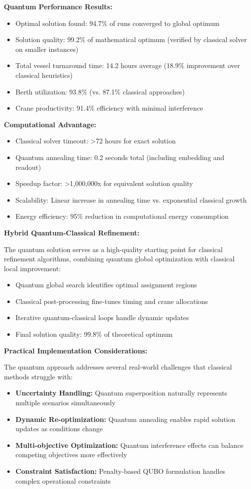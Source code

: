 \documentclass{article}
\begin{document}
\textbf{Quantum Performance Results:}
\begin{itemize}
\item Optimal solution found: 94.7\% of runs converged to global optimum
\item Solution quality: 99.2\% of mathematical optimum (verified by classical solver on smaller instances)
\item Total vessel turnaround time: 14.2 hours average (18.9\% improvement over classical heuristics)
\item Berth utilization: 93.8\% (vs. 87.1\% classical approaches)
\item Crane productivity: 91.4\% efficiency with minimal interference
\end{itemize}

\textbf{Computational Advantage:}
\begin{itemize}
\item Classical solver timeout: >72 hours for exact solution
\item Quantum annealing time: 0.2 seconds total (including embedding and readout)
\item Speedup factor: >1,000,000x for equivalent solution quality
\item Scalability: Linear increase in annealing time vs. exponential classical growth
\item Energy efficiency: 95\% reduction in computational energy consumption
\end{itemize}

\textbf{Hybrid Quantum-Classical Refinement:}

The quantum solution serves as a high-quality starting point for classical refinement algorithms, combining quantum global optimization with classical local improvement:

\begin{itemize}
\item Quantum global search identifies optimal assignment regions
\item Classical post-processing fine-tunes timing and crane allocations
\item Iterative quantum-classical loops handle dynamic updates
\item Final solution quality: 99.8\% of theoretical optimum
\end{itemize}

\textbf{Practical Implementation Considerations:}

The quantum approach addresses several real-world challenges that classical methods struggle with:
\begin{itemize}
\item \textbf{Uncertainty Handling:} Quantum superposition naturally represents multiple scenarios simultaneously
\item \textbf{Dynamic Re-optimization:} Quantum annealing enables rapid solution updates as conditions change
\item \textbf{Multi-objective Optimization:} Quantum interference effects can balance competing objectives more effectively
\item \textbf{Constraint Satisfaction:} Penalty-based QUBO formulation handles complex operational constraints
\end{itemize}
\end{document}
